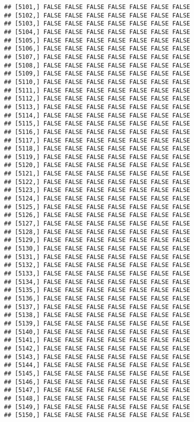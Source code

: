 \documentclass[
]{article}
\begin{document}
\begin{verbatim}
## [5101,] FALSE FALSE FALSE FALSE FALSE FALSE FALSE
## [5102,] FALSE FALSE FALSE FALSE FALSE FALSE FALSE
## [5103,] FALSE FALSE FALSE FALSE FALSE FALSE FALSE
## [5104,] FALSE FALSE FALSE FALSE FALSE FALSE FALSE
## [5105,] FALSE FALSE FALSE FALSE FALSE FALSE FALSE
## [5106,] FALSE FALSE FALSE FALSE FALSE FALSE FALSE
## [5107,] FALSE FALSE FALSE FALSE FALSE FALSE FALSE
## [5108,] FALSE FALSE FALSE FALSE FALSE FALSE FALSE
## [5109,] FALSE FALSE FALSE FALSE FALSE FALSE FALSE
## [5110,] FALSE FALSE FALSE FALSE FALSE FALSE FALSE
## [5111,] FALSE FALSE FALSE FALSE FALSE FALSE FALSE
## [5112,] FALSE FALSE FALSE FALSE FALSE FALSE FALSE
## [5113,] FALSE FALSE FALSE FALSE FALSE FALSE FALSE
## [5114,] FALSE FALSE FALSE FALSE FALSE FALSE FALSE
## [5115,] FALSE FALSE FALSE FALSE FALSE FALSE FALSE
## [5116,] FALSE FALSE FALSE FALSE FALSE FALSE FALSE
## [5117,] FALSE FALSE FALSE FALSE FALSE FALSE FALSE
## [5118,] FALSE FALSE FALSE FALSE FALSE FALSE FALSE
## [5119,] FALSE FALSE FALSE FALSE FALSE FALSE FALSE
## [5120,] FALSE FALSE FALSE FALSE FALSE FALSE FALSE
## [5121,] FALSE FALSE FALSE FALSE FALSE FALSE FALSE
## [5122,] FALSE FALSE FALSE FALSE FALSE FALSE FALSE
## [5123,] FALSE FALSE FALSE FALSE FALSE FALSE FALSE
## [5124,] FALSE FALSE FALSE FALSE FALSE FALSE FALSE
## [5125,] FALSE FALSE FALSE FALSE FALSE FALSE FALSE
## [5126,] FALSE FALSE FALSE FALSE FALSE FALSE FALSE
## [5127,] FALSE FALSE FALSE FALSE FALSE FALSE FALSE
## [5128,] FALSE FALSE FALSE FALSE FALSE FALSE FALSE
## [5129,] FALSE FALSE FALSE FALSE FALSE FALSE FALSE
## [5130,] FALSE FALSE FALSE FALSE FALSE FALSE FALSE
## [5131,] FALSE FALSE FALSE FALSE FALSE FALSE FALSE
## [5132,] FALSE FALSE FALSE FALSE FALSE FALSE FALSE
## [5133,] FALSE FALSE FALSE FALSE FALSE FALSE FALSE
## [5134,] FALSE FALSE FALSE FALSE FALSE FALSE FALSE
## [5135,] FALSE FALSE FALSE FALSE FALSE FALSE FALSE
## [5136,] FALSE FALSE FALSE FALSE FALSE FALSE FALSE
## [5137,] FALSE FALSE FALSE FALSE FALSE FALSE FALSE
## [5138,] FALSE FALSE FALSE FALSE FALSE FALSE FALSE
## [5139,] FALSE FALSE FALSE FALSE FALSE FALSE FALSE
## [5140,] FALSE FALSE FALSE FALSE FALSE FALSE FALSE
## [5141,] FALSE FALSE FALSE FALSE FALSE FALSE FALSE
## [5142,] FALSE FALSE FALSE FALSE FALSE FALSE FALSE
## [5143,] FALSE FALSE FALSE FALSE FALSE FALSE FALSE
## [5144,] FALSE FALSE FALSE FALSE FALSE FALSE FALSE
## [5145,] FALSE FALSE FALSE FALSE FALSE FALSE FALSE
## [5146,] FALSE FALSE FALSE FALSE FALSE FALSE FALSE
## [5147,] FALSE FALSE FALSE FALSE FALSE FALSE FALSE
## [5148,] FALSE FALSE FALSE FALSE FALSE FALSE FALSE
## [5149,] FALSE FALSE FALSE FALSE FALSE FALSE FALSE
## [5150,] FALSE FALSE FALSE FALSE FALSE FALSE FALSE

\end{verbatim}
\end{document}
